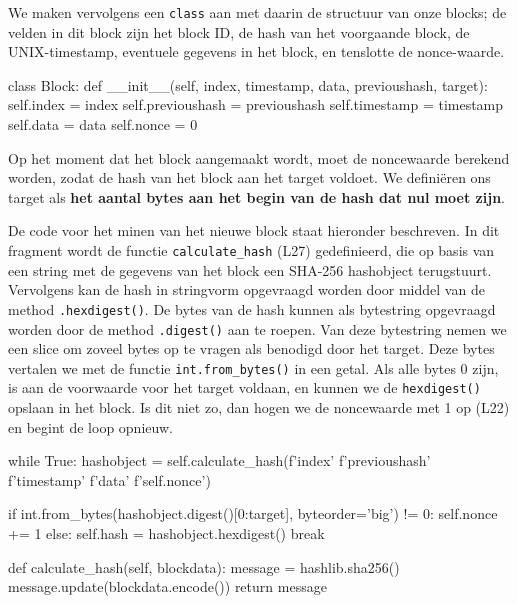 \documentclass{article}
\begin{document}
We maken vervolgens een \texttt{class} aan met daarin de structuur van onze blocks; de velden in dit block zijn het block ID, de hash van het voorgaande block, de UNIX-timestamp, eventuele gegevens in het block, en tenslotte de nonce-waarde.
\begin{python3code}
class Block:
    def __init__(self, index, timestamp, data, previoushash, target):
        self.index = index
        self.previoushash = previoushash
        self.timestamp = timestamp
        self.data = data
        self.nonce = 0
        
\end{python3code}

Op het moment dat het block aangemaakt wordt, moet de noncewaarde berekend worden, zodat de hash van het block aan het target voldoet. We definiëren ons target als \textbf{het aantal bytes aan het begin van de hash dat nul moet zijn}. 

De code voor het minen van het nieuwe block staat hieronder beschreven. In dit fragment wordt de functie \texttt{calculate\_hash} (L27) gedefinieerd, die op basis van een string met de gegevens van het block een SHA-256 hashobject terugstuurt. Vervolgens kan de hash in stringvorm opgevraagd worden door middel van de method \texttt{.hexdigest()}. De bytes van de hash kunnen als bytestring opgevraagd worden door de method \texttt{.digest()} aan te roepen. Van deze bytestring nemen we een slice om zoveel bytes op te vragen als benodigd door het target. Deze bytes vertalen we met de functie \texttt{int.from\_bytes()} in een getal. Als alle bytes 0 zijn, is aan de voorwaarde voor het target voldaan, en kunnen we de \texttt{hexdigest()} opslaan in het block. Is dit niet zo, dan hogen we de noncewaarde met 1 op (L22) en begint de loop opnieuw.

\newpage	
\begin{python3code}
        while True:
            hashobject = self.calculate_hash(f'{index}'
                                             f'{previoushash}'
                                             f'{timestamp}'
                                             f'{data}'
                                             f'{self.nonce}')

            if int.from_bytes(hashobject.digest()[0:target], byteorder='big') != 0:
                self.nonce += 1
            else:
                self.hash = hashobject.hexdigest()
                break

    def calculate_hash(self, blockdata):
        message = hashlib.sha256()
        message.update(blockdata.encode())
        return message


\end{python3code}
\end{document}

